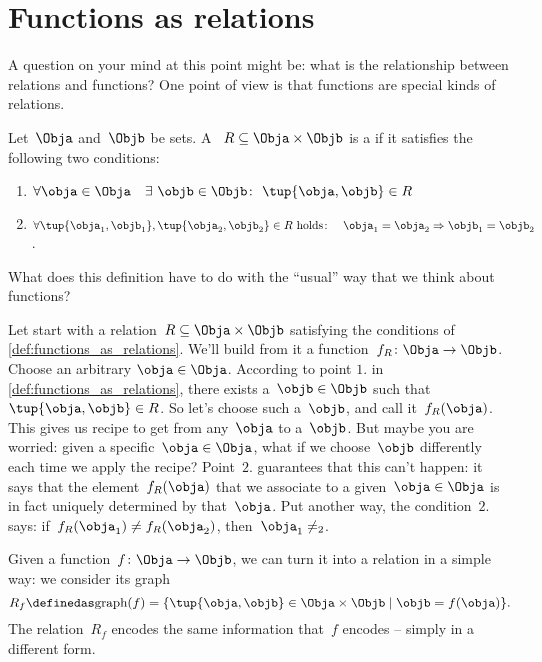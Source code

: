 

\section{Functions as relations}

A question on your mind at this point might be: what is the relationship between relations and functions? One point of view is that functions are special kinds of relations.

\begin{definition}
  \label{def:functions_as_relations}
  Let~$\Obja$ and~$\Objb$ be sets. A ~$R \subseteq \Obja \times \Objb$ is a \textbf{} if it satisfies the following two conditions:
  \begin{enumerate}
    \item $\forall \obja \in \Obja \quad \exists \ \objb \in \Objb\colon  \ \tup{\obja,\objb} \in R$
    \item $\forall \tup{\obja_1, \objb_1}, \tup{\obja_2, \objb_2} \in R  \text{ holds}\colon \quad \obja_1 = \obja_2 \Rightarrow \objb_1 = \objb_2$.
  \end{enumerate}
\end{definition}

What does this definition have to do with the ``usual'' way that we think about functions?

Let start with a relation~$R \subseteq \Obja \times \Objb$ satisfying the conditions of \cref{def:functions_as_relations}. We'll build from it a function~$f_R \colon \Obja \to \Objb$. Choose an arbitrary $\obja \in \Obja$. According to point $1.$ in \cref{def:functions_as_relations}, there exists a~$\objb \in \Objb$ such that~$\tup{\obja,\objb} \in R$. So let's choose such a~$\objb$, and call it~$f_R(\obja)$. This gives us recipe to get from any~$\obja$ to a~$\objb$. But maybe you are worried: given a specific~$\obja \in \Obja$, what if we choose~$\objb$ differently each time we apply the recipe? Point~$2.$ guarantees that this can't happen: it says that the element~$f_R(\obja)$ that we associate to a given~$\obja \in \Obja$ is in fact uniquely determined by that~$\obja$. Put another way, the condition~$2.$ says: if~$f_R(\obja_1) \neq f_R(\obja_2)$, then~$\obja_1 \neq _2$.

Given a function~$f \colon \Obja \rightarrow \Objb$, we can turn it into a relation in a simple way: we consider its graph
\begin{equation*}
  R_f \definedas \text{graph}(f) = \{ \tup{\obja,\objb} \in \Obja \times \Objb \mid \objb= f(\obja) \}.
\end{equation*}
The relation~$R_f$ encodes the same information that~$f$ encodes -- simply in a different form.

